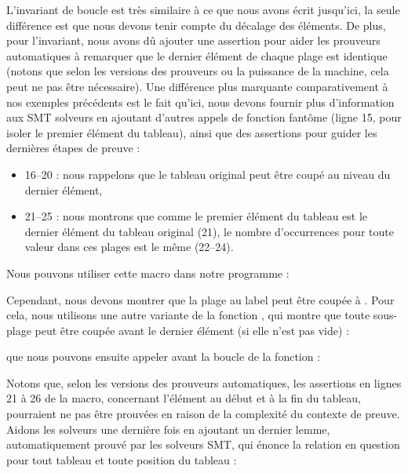 L'invariant de boucle est très similaire à ce que nous avons écrit jusqu'ici,
la seule différence est que nous devons tenir compte du décalage
des éléments. De plus, pour l'invariant, nous avons dû ajouter une assertion
pour aider les prouveurs automatiques à remarquer que le dernier élément de
chaque plage est identique (notons que selon les versions des prouveurs ou la
puissance de la machine, cela peut ne pas être nécessaire). Une différence
plus marquante comparativement à nos exemples précédents est le fait qu'ici, nous
devons fournir plus d'information aux SMT solveurs en ajoutant d'autres appels
de fonction fantôme (ligne 15, pour isoler le premier élément du tableau), ainsi
que des assertions pour guider les dernières étapes de preuve :
\begin{itemize}
    \item 16--20 : nous rappelons que le tableau original peut être coupé au
          niveau du dernier élément,
    \item 21--25 : nous montrons que comme le premier élément du tableau est le
          dernier élément du tableau original (21), le nombre d'occurrences pour
          toute valeur dans ces plages est le même (22--24).
\end{itemize}


Nous pouvons utiliser cette macro dans notre programme :




Cependant, nous devons montrer que la plage au label  peut
être coupée à . Pour cela, nous utilisons une autre variante de la
fonction , qui montre que toute sous-plage peut être coupée avant
le dernier élément (si elle n'est pas vide) :




que nous pouvons ensuite appeler avant la boucle de la fonction  :




Notons que, selon les versions des prouveurs automatiques, les assertions en lignes
21 à 26 de la macro, concernant l'élément au début et à la fin du tableau,
pourraient ne pas être prouvées en raison de la complexité du contexte de preuve.
Aidons les solveurs une dernière fois en ajoutant un dernier lemme, automatiquement
prouvé par les solveurs SMT, qui énonce la relation en question pour tout
tableau et toute position du tableau :


